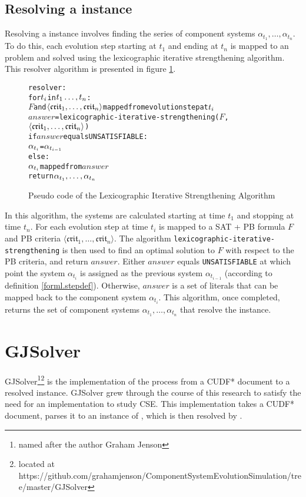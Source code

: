 \subsection{Resolving a \modelname instance}
Resolving a \modelname instance involves finding the series of component systems $\alpha_{t_1},\ldots,\alpha_{t_n}$.
To do this, each evolution step starting at $t_1$ and ending at $t_n$ is mapped to an \modelimpl problem and solved using the lexicographic iterative strengthening algorithm.
This resolver algorithm is presented in figure \ref{impl.resolver}.
\begin{figure}[h!t!]
\begin{center}
\begin{alltt}
resolver:  
    for \(t\sb{i}\) in \(t\sb{1}\ldots,t\sb{n}\):
        \(F\) and \(\langle{}\mathfrak{crit}\sb{1}, \ldots ,\mathfrak{crit}\sb{n}\rangle\) mapped from evolution step at \(t\sb{i}\)
        \(answer\) = lexicographic-iterative-strengthening(\(F\),\(\langle{}\mathfrak{crit}\sb{1}, \ldots ,\mathfrak{crit}\sb{n}\rangle\))
        if \(answer\) equals UNSATISFIABLE:
            \(\alpha\sb{t\sb{i}}\) = \(\alpha\sb{t\sb{i-1}}\)
        else:
            \(\alpha\sb{t\sb{i}}\) mapped from \(answer\)
    return \(\alpha\sb{t\sb{1}},\ldots,\alpha\sb{t\sb{n}}\) 
\end{alltt}
  \caption{Pseudo code of the Lexicographic Iterative Strengthening Algorithm}
  \label{impl.resolver}
\end{center}
\end{figure}

In this algorithm, the systems are calculated starting at time $t_1$ and stopping at time $t_n$.
For each evolution step at time $t_i$ is mapped to a SAT + PB formula $F$ and PB criteria $\langle \mathfrak{crit}_{1}, \ldots ,\mathfrak{crit}_{n} \rangle$.
The algorithm \texttt{lexicographic-iterative-strengthening} is then used to find an optimal solution to $F$ with respect to the PB criteria, and return $answer$.
Either $answer$ equals \texttt{UNSATISFIABLE} at which point the system $\alpha_{t_i}$ is assigned as the previous system $\alpha_{t_{i-1}}$ (according to definition \ref{forml.stepdef}).
Otherwise, $answer$ is a set of literals that can be mapped back to the component system $\alpha_{t_i}$.
This algorithm, once completed, returns the set of component systems $\alpha_{t_1},\ldots,\alpha_{t_n}$ that resolve the \modelname instance.

\section{GJSolver}
\label{impl.gjsolver}
GJSolver\footnote{named after the author Graham Jenson}\footnote{located at https://github.com/grahamjenson/ComponentSystemEvolutionSimulation/tree/master/GJSolver} 
is the implementation of the process from a CUDF* document to a resolved \modelname instance.
GJSolver grew through the course of this research to satisfy the need for an implementation to study CSE.
This implementation takes a CUDF* document, parses it to an instance of \modelname, which is then resolved by \modelimpl.

